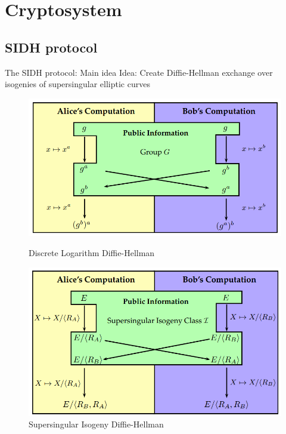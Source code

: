 \documentclass[handout]{beamer}
\begin{document}
\section{Cryptosystem}

\subsection{SIDH protocol}

\begin{frame}{The SIDH protocol: Main idea}
Idea: Create Diffie-Hellman exchange over isogenies of supersingular elliptic curves %
\begin{figure}
	\begin{minipage}{0.5\textwidth}
		\centering
		\includegraphics[width=1\linewidth]{DLDH}
		\caption{Discrete Logarithm Diffie-Hellman}\label{fig:dldh}
	\end{minipage}\hfill
	\begin{minipage}{0.48\textwidth}
		\centering
		\includegraphics[width=1\linewidth]{SIDH}
		\caption{Supersingular Isogeny Diffie-Hellman}\label{fig:sidh}
	\end{minipage}
\end{figure}

\end{frame}
\end{document}
